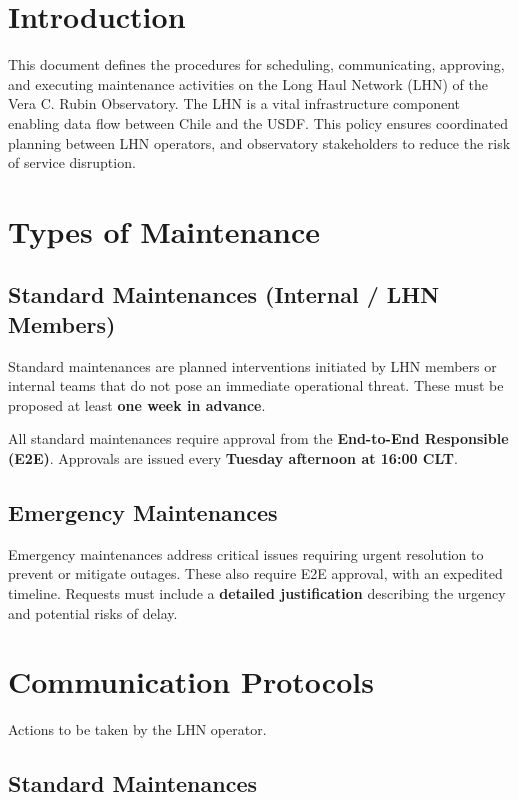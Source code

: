 \section*{Introduction}

This document defines the procedures for scheduling, communicating, approving, and executing maintenance activities on the Long Haul Network (LHN) of the Vera C. Rubin Observatory. The LHN is a vital infrastructure component enabling data flow between Chile and the USDF. This policy ensures coordinated planning between LHN operators, and observatory stakeholders to reduce the risk of service disruption.

\section{Types of Maintenance}

\subsection{Standard Maintenances (Internal / LHN Members)}

Standard maintenances are planned interventions initiated by LHN members or internal teams that do not pose an immediate operational threat. These must be proposed at least \textbf{one week in advance}.

All standard maintenances require approval from the \textbf{End-to-End Responsible (E2E)}. Approvals are issued every \textbf{Tuesday afternoon at 16:00 CLT}.

\subsection{Emergency Maintenances}

Emergency maintenances address critical issues requiring urgent resolution to prevent or mitigate outages. These also require E2E approval, with an expedited timeline. Requests must include a \textbf{detailed justification} describing the urgency and potential risks of delay.

\section{Communication Protocols}

Actions to be taken by the LHN operator.

\subsection{Standard Maintenances}

